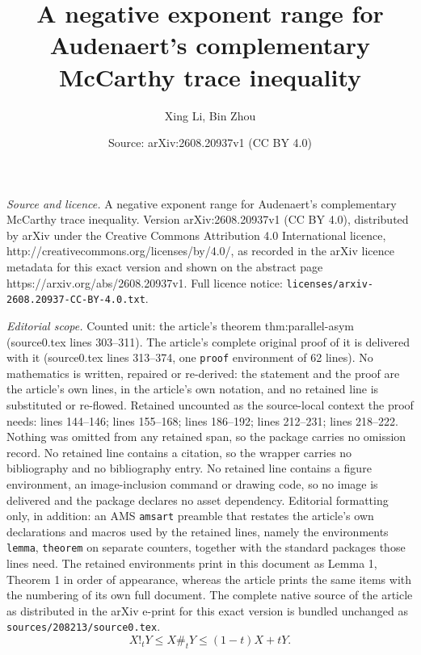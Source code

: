 \documentclass[10pt,a4paper]{amsart}
\title{A negative exponent range for Audenaert's complementary McCarthy trace inequality}
\author{Xing Li, Bin Zhou}
\date{Source: arXiv:2608.20937v1 (CC BY 4.0)}
\begin{document}
\maketitle

\noindent\emph{Source and licence.} A negative exponent range for Audenaert's complementary McCarthy trace inequality. Version arXiv:2608.20937v1 (CC BY 4.0), distributed by arXiv under the Creative Commons Attribution 4.0 International licence, http://creativecommons.org/licenses/by/4.0/, as recorded in the arXiv licence metadata for this exact version and shown on the abstract page https://arxiv.org/abs/2608.20937v1. Full licence notice: \texttt{licenses/arxiv-2608.20937-CC-BY-4.0.txt}.\par\smallskip

\noindent\textit{Editorial scope.} Counted unit: the article's theorem thm:parallel-asym (source0.tex lines 303--311). The article's complete original proof of it is delivered with it (source0.tex lines 313--374, one \texttt{proof} environment of 62 lines). No mathematics is written, repaired or re-derived: the statement and the proof are the article's own lines, in the article's own notation, and no retained line is substituted or re-flowed.  Retained uncounted as the source-local context the proof needs: lines 144--146; lines 155--168; lines 186--192; lines 212--231; lines 218--222.  Nothing was omitted from any retained span, so the package carries no omission record.  No retained line contains a citation, so the wrapper carries no bibliography and no bibliography entry.  No retained line contains a figure environment, an image-inclusion command or drawing code, so no image is delivered and the package declares no asset dependency.  Editorial formatting only, in addition: an AMS \texttt{amsart} preamble that restates the article's own declarations and macros used by the retained lines, namely the environments \texttt{lemma}, \texttt{theorem} on separate counters, together with the standard packages those lines need.  The retained environments print in this document as Lemma 1, Theorem 1 in order of appearance, whereas the article prints the same items with the numbering of its own full document.  The complete native source of the article as distributed in the arXiv e-print for this exact version is bundled unchanged as \texttt{sources/208213/source0.tex}.
\begin{equation}\label{eq:weighted-mean-chain}
    X!_tY\le X\#_tY\le (1-t)X+tY.
\end{equation}
\end{document}
